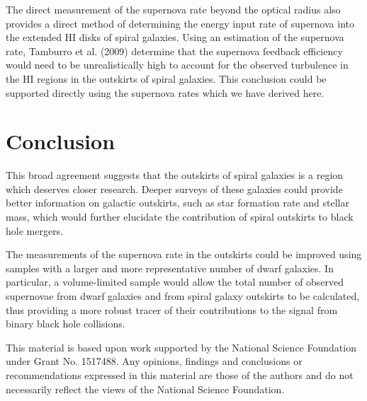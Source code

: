 \documentclass[apj]{emulateapj}
\begin{document}
The direct measurement of the supernova rate beyond the optical radius also provides a direct method of determining the energy input rate of supernova into the extended HI disks of spiral galaxies. Using an estimation of the supernova rate, Tamburro et al. (2009) determine that the supernova feedback efficiency would need to be unrealistically high to account for the observed turbulence in the HI regions in the outskirts of spiral galaxies. This conclusion could be supported directly using the supernova rates which we have derived here.

\section{Conclusion}

This broad agreement suggests that the outskirts of spiral galaxies is a region which deserves closer research. Deeper surveys of these galaxies could provide better information on galactic outskirts, such as star formation rate and stellar mass, which would further elucidate the contribution of spiral outskirts to black hole mergers. 

The measurements of the supernova rate in the outskirts could be improved using samples with a larger and more representative number of dwarf galaxies. In particular, a volume-limited sample would allow the total number of observed supernovae from dwarf galaxies and from spiral galaxy outskirts to be calculated, thus providing a more robust tracer of their contributions to the signal from binary black hole collisions.


This material is based upon work supported by the National Science Foundation under Grant No. 1517488. Any opinions, findings and conclusions or recommendations expressed in this material are those of the authors and do not necessarily reflect the views of the National Science Foundation.
\end{document}
